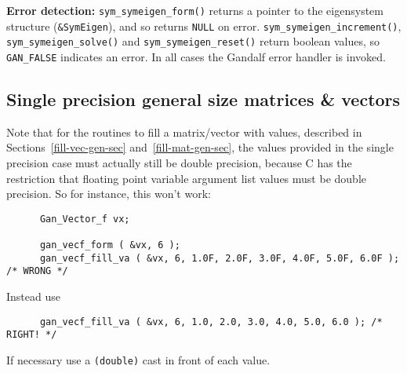 {\bf Error detection:} {\tt sym\_symeigen\_form()} returns a pointer to
the eigensystem structure ({\tt \&SymEigen}), and so returns {\tt NULL} on
error. {\tt sym\_symeigen\_increment()}, {\tt sym\_symeigen\_solve()} and
{\tt sym\_symeigen\_reset()} return boolean values, so {\tt GAN\_FALSE}
indicates an error. In all cases the Gandalf error handler is invoked.

\subsection{Single precision general size matrices \& vectors}
Note that for the routines to fill a matrix/vector with values, described
in Sections~\ref{fill-vec-gen-sec} and~\ref{fill-mat-gen-sec}, the values
provided in the single precision case must actually still be double precision,
because C has the restriction that floating point variable argument list
values must be double precision. So for instance, this won't work:
\begin{verbatim}
      Gan_Vector_f vx;

      gan_vecf_form ( &vx, 6 );
      gan_vecf_fill_va ( &vx, 6, 1.0F, 2.0F, 3.0F, 4.0F, 5.0F, 6.0F ); /* WRONG */
\end{verbatim}
Instead use
\begin{verbatim}
      gan_vecf_fill_va ( &vx, 6, 1.0, 2.0, 3.0, 4.0, 5.0, 6.0 ); /* RIGHT! */
\end{verbatim}
\label{single-gen-sec}
If necessary use a {\tt (double)} cast in front of each value.

